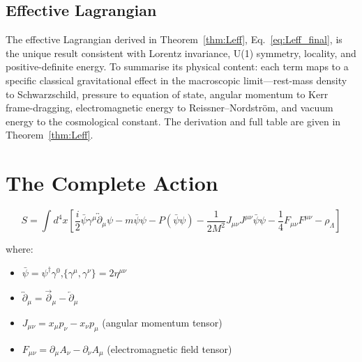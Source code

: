 \documentclass[11pt,a4paper]{article}
\theoremstyle{definition}
\theoremstyle{remark}
\begin{document}
	\subsection{Effective Lagrangian}
	\label{sec:eff_lagrangian_summary}

	\newcommand{\efflagalias}{\eqref{eq:Leff_final}}%

	The effective Lagrangian derived in Theorem~\ref{thm:Leff}, Eq.~\eqref{eq:Leff_final},
	is the unique result consistent with Lorentz invariance, U(1) symmetry, locality,
	and positive-definite energy.  To summarise its physical content: each term maps to
	a specific classical gravitational effect in the macroscopic limit---rest-mass density
	to Schwarzschild, pressure to equation of state, angular momentum to Kerr
	frame-dragging, electromagnetic energy to Reissner--Nordstr\"om, and vacuum energy to
	the cosmological constant.  The derivation and full table are given in
	Theorem~\ref{thm:Leff}.
	
	\section{The Complete Action}
	
	\begin{equation}
		\boxed{
			S = \int d^4x \left[\frac{i}{2}\bar{\psi}\gamma^\mu\overleftrightarrow{\partial}_\mu\psi - m\bar{\psi}\psi - P(\bar{\psi}\psi) - \frac{1}{2M^2}J_{\mu\nu}J^{\mu\nu}\bar{\psi}\psi - \frac{1}{4}F_{\mu\nu}F^{\mu\nu} - \rho_\Lambda\right]
		}
		\label{eq:complete_action}
	\end{equation}
	
	where:
	\begin{itemize}
		\item $\bar{\psi}=\psi^\dagger\gamma^0$,\quad $\{\gamma^\mu,\gamma^\nu\}=2\eta^{\mu\nu}$
		\item $\overleftrightarrow{\partial}_\mu = \overrightarrow{\partial}_\mu - \overleftarrow{\partial}_\mu$
		\item $J_{\mu\nu} = x_\mu p_\nu - x_\nu p_\mu$ (angular momentum tensor)
		\item $F_{\mu\nu} = \partial_\mu A_\nu - \partial_\nu A_\mu$ (electromagnetic field tensor)
	\end{itemize}
	
\end{document}
